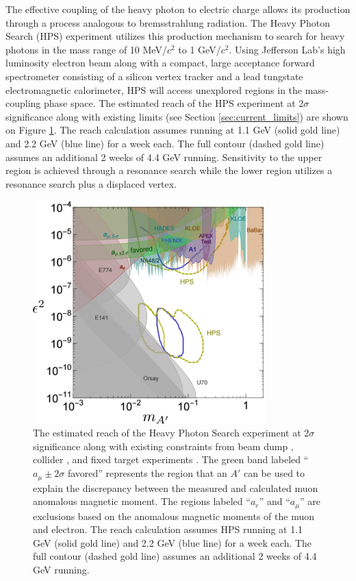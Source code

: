 The effective coupling of the heavy photon to electric charge allows its 
production through a process analogous to bremsstrahlung radiation.  The Heavy
Photon Search (HPS)  experiment utilizes this production mechanism to search
for heavy photons in the mass range of 10 MeV/$c^2$ to 1 GeV/$c^2$.  Using 
Jefferson Lab's high luminosity electron beam along with a compact, large
acceptance forward spectrometer consisting of a silicon vertex tracker and a
lead tungstate electromagnetic calorimeter, HPS will access unexplored regions
in the mass-coupling phase space. The estimated reach of the HPS experiment at 
2$\sigma$ significance along with existing limits 
(see Section \ref{sec:current_limits}) are shown on Figure 
\ref{fig:ap_limits}. The reach calculation assumes running at 1.1
GeV (solid gold line) and 2.2 GeV (blue line) for a week each.  The full 
contour (dashed gold line) assumes an additional 2 weeks of 4.4 GeV running. 
Sensitivity to the upper region is achieved through a resonance search while
the lower region utilizes a resonance search plus a displaced vertex.
\begin{figure}[h!t]
    \centering
    \includegraphics[width=0.80\textwidth]{images/ap_current_constraints.png}
    \caption{The estimated reach of the Heavy Photon Search experiment at 
             2$\sigma$ significance along with existing constraints from 
             beam dump  \cite{},
             collider \cite{}, 
             and fixed target experiments \cite{}.  The green band labeled 
             ``$a_{\mu} \pm 2\sigma$ favored'' represents the region that an 
             $A'$ can be used to explain the discrepancy between the measured 
             and calculated muon anomalous magnetic moment.  The regions 
             labeled ``$a_e$'' and ``$a_\mu$'' are exclusions based on the 
             anomalous magnetic moments of the muon and electron.
             The reach calculation assumes HPS running at 1.1 GeV 
             (solid gold line) and 2.2 GeV (blue line) for a week each.  The
             full contour (dashed gold line) assumes an additional 2 weeks of 
             4.4 GeV running.}
    \label{fig:ap_limits}
\end{figure}

